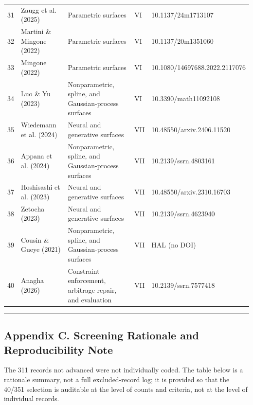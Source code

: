 \documentclass[11pt]{article}
\begin{document}
\begin{longtable}{@{}p{}p{}p{}p{}p{}@{}}
31 & Zaugg et al. (2025) & Parametric surfaces & VI & 10.1137/24m1713107 \\
32 & Martini \& Mingone (2022) & Parametric surfaces & VI & 10.1137/20m1351060 \\
33 & Mingone (2022) & Parametric surfaces & VI & 10.1080/14697688.2022.2117076 \\
34 & Luo \& Yu (2023) & Nonparametric, spline, and Gaussian-process surfaces & VI & 10.3390/math11092108 \\
35 & Wiedemann et al. (2024) & Neural and generative surfaces & VII & 10.48550/arxiv.2406.11520 \\
36 & Appana et al. (2024) & Nonparametric, spline, and Gaussian-process surfaces & VII & 10.2139/ssrn.4803161 \\
37 & Hoshisashi et al. (2023) & Neural and generative surfaces & VII & 10.48550/arxiv.2310.16703 \\
38 & Zetocha (2023) & Neural and generative surfaces & VII & 10.2139/ssrn.4623940 \\
39 & Cousin \& Gueye (2021) & Nonparametric, spline, and Gaussian-process surfaces & VII & HAL (no DOI) \\
40 & Anagha (2026) & Constraint enforcement, arbitrage repair, and evaluation & VII & 10.2139/ssrn.7577418 \\
\bottomrule
\end{longtable}
\endgroup

\par\medskip\hrule\medskip
\subsection*{Appendix C. Screening Rationale and Reproducibility Note}
The 311 records not advanced were not individually coded. The table below is a rationale summary, not a full excluded-record log; it is provided so that the 40/351 selection is auditable at the level of counts and criteria, not at the level of individual records.
\end{document}
